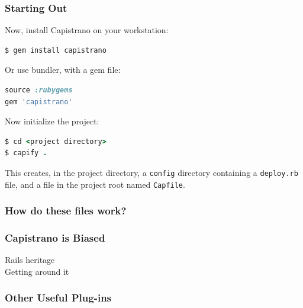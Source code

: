\documentclass[t,handout]{beamer}
\begin{document}
\begin{frame}[fragile]
\frametitle{Starting Out}
Now, install Capistrano on your workstation:\\
\begin{lstlisting}[frame=none,language=Ruby,basicstyle=\scriptsize\ttfamily\color{black},]
$ gem install capistrano
\end{lstlisting}
Or use bundler, with a gem file:
\begin{lstlisting}[frame=none,language=Ruby,basicstyle=\scriptsize\ttfamily\color{black},]
source :rubygems
gem 'capistrano'
\end{lstlisting}
Now initialize the project:
\begin{lstlisting}[frame=none,language=Ruby,basicstyle=\scriptsize\ttfamily\color{black},]
$ cd <project directory>
$ capify .
\end{lstlisting}
This creates, in the project directory, a {\small\tt config} directory containing a {\small\tt deploy.rb} file, and a file in the project root named {\small\tt Capfile}.
\end{frame}

\begin{frame}[fragile]
\frametitle{How do these files work?}
\end{frame}

\begin{frame}
\frametitle{Capistrano is Biased}
Rails heritage \\
Getting around it
\end{frame}

\begin{frame}
\frametitle{Other Useful Plug-ins}
\end{frame}
\end{document}
